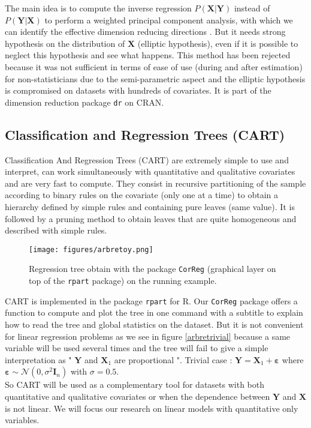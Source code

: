 \documentclass[12pt,a4paper]{report}
\begin{document}
		The main idea is to compute the inverse regression $P(\boldsymbol{X}|\boldsymbol{Y})$ instead of $P(\boldsymbol{Y}|\boldsymbol{X})$ to perform a weighted principal component analysis, with which we can identify the effective dimension reducing directions \cite{li1991sliced}. But it needs strong hypothesis on the distribution of $\boldsymbol{X}$ (elliptic hypothesis), even if it is possible to neglect this hypothesis \cite{saracco1999regression} and see what happens. This method has been rejected because it was not sufficient in terms of ease of use (during and after estimation) for non-statisticians due to the semi-parametric aspect and the elliptic hypothesis is compromised on datasets with hundreds of covariates. It is part of the dimension reduction package {\tt dr} on CRAN.
			
		
			
		
\subsection{Classification and Regression Trees (CART)}

	
		Classification And Regression Trees (CART) \cite{breiman1984classification} are extremely simple to use and interpret, can work simultaneously with quantitative and qualitative covariates and are very fast to compute. They consist in recursive partitioning of the sample according to binary rules on the covariate (only one at a time) to obtain a hierarchy defined by simple rules and containing pure leaves (same value). It is followed by a pruning method to obtain leaves that are quite homogeneous and described with simple rules.
		
		\begin{figure}
			\centering
				\texttt{[image: figures/arbretoy.png]} 
			\caption{Regression tree obtain with the package {\tt CorReg}
			 (graphical layer on top of  the {\tt rpart} package) on the running example.}\label{arbretoy}
		\end{figure}
		CART is implemented in the package {\tt rpart} 
		for R. Our {\tt CorReg} 
		package offers a function to compute and plot the tree in one command with a subtitle to explain how to read the tree and global statistics on the dataset.
		But it is not convenient for linear regression problems as we see in figure \ref{arbretrivial} because a same variable will be used several times and the tree will fail to give a simple interpretation as " $\boldsymbol{Y}$ and $\boldsymbol{X}_1$ are proportional ". Trivial case : $\boldsymbol{Y}=\boldsymbol{X}_1 + \boldsymbol{\varepsilon}$ where $\boldsymbol{\varepsilon} \sim \mathcal{N}(0, \sigma^2 \boldsymbol{I}_n)$ with $\sigma=0.5$. \\
		So CART will be used as a complementary tool for datasets with both quantitative and qualitative covariates or when the dependence between $\boldsymbol{Y}$ and $\boldsymbol{X}$ is not linear. We will focus our research on linear models with quantitative only variables.
	
\end{document}
